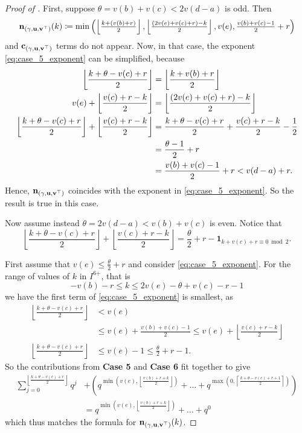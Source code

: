 \begin{proof}[Proof of ]
  First, suppose $\theta = v(b) + v(c) < 2v(d-a)$ is odd.
  Then
  \[ \mathbf n_{(\gamma, \mathbf u, \mathbf v^\top)}(k) \coloneqq \min\left( \left\lfloor \tfrac{k + (v(b)+r)}{2} \right\rfloor,
      \left\lfloor \tfrac{(2v(e)+v(c)+r)-k}{2} \right\rfloor,
      v(e), \tfrac{v(b)+v(c)-1}{2} + r \right) \]
  and $\mathbf c_{(\gamma, \mathbf u, \mathbf v^\top)}$ terms do not appear.
  Now, in that case, the exponent \eqref{eq:case_5_exponent} can be simplified, because
  \begin{align*}
    \left\lfloor \frac{k+\theta-v(c)+r}{2} \right\rfloor
    &= \left\lfloor \frac{k+v(b)+r}{2} \right\rfloor \\
    v(e) + \left\lfloor \frac{v(c)+r-k}{2} \right\rfloor
    &= \left\lfloor \frac{(2v(e) + v(c) + r) - k}{2} \right\rfloor \\
    \left\lfloor \frac{k+\theta-v(c)+r}{2} \right\rfloor
    + \left\lfloor \frac{v(c)+r-k}{2} \right\rfloor
    &= \frac{k+\theta-v(c)+r}{2} + \frac{v(c)+r-k}{2} - \frac{1}{2} \\
    &= \frac{\theta-1}{2} + r \\
    &= \frac{v(b)+v(c)-1}{2} + r < v(d-a) + r.
  \end{align*}
  Hence, $\mathbf n_{(\gamma, \mathbf u, \mathbf v^\top)}$ coincides with the exponent in \eqref{eq:case_5_exponent}.
  So the result is true in this case.

  Now assume instead $\theta = 2v(d-a) < v(b) + v(c)$ is even.
  Notice that
  \[ \left\lfloor \frac{k+\theta-v(c)+r}{2} \right\rfloor
    + \left\lfloor \frac{v(c)+r-k}{2} \right\rfloor
    = \frac{\theta}{2} + r - \mathbf{1}_{k + v(c) + r \equiv 0 \bmod 2}. \]

  First assume that $v(e) \le \frac{\theta}{2} + r$ and
  consider \eqref{eq:case_5_exponent}.
  For the range of values of $k$ in $I^{\text{6+}}$, that is
  \[ -v(b) - r \le k \le 2v(e)-\theta+v(c)-r-1 \]
  we have the first term of \eqref{eq:case_5_exponent} is smallest, as
  \begin{align*}
    \left\lfloor \frac{k + \theta - v(c) + r}{2} \right\rfloor &< v(e) \\
    &\le v(e) + \frac{v(b)+v(c)-1}{2}
      \le v(e) + \left\lfloor \frac{v(c)+r-k}{2} \right\rfloor \\
    \left\lfloor \frac{k + \theta - v(c) + r}{2} \right\rfloor &\le v(e)-1
      \le \frac{\theta}{2} + r -1.
  \end{align*}
  So the contributions from \textbf{Case 5} and \textbf{Case 6}
  fit together to give
  \begin{align*}
    \sum_{j=0}^{\left\lfloor \frac{k+\theta-v(c)+r}{2} \right\rfloor} q^j
    &+
    \left(
    q^{\min\left( v(e), \left\lfloor \frac{v(b) + r + k}{2} \right\rfloor \right)}
    + \dots
    + q^{\max\left(0, \left\lceil \frac{k + \theta - v(c) + r + 1}{2} \right\rceil \right)}
    \right) \\
    &=
    q^{\min(v(e), \left\lfloor \frac{v(b) + r + k}{2} \right\rfloor)} + \dots + q^0
  \end{align*}
  which thus matches the formula for $\mathbf n_{(\gamma, \mathbf u, \mathbf v^\top)}(k)$.


\end{proof}
